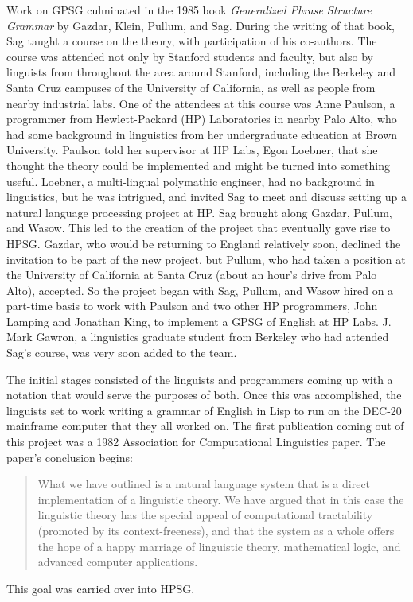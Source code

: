 \documentclass[output=paper]{langsci/langscibook}
\begin{document}
Work on GPSG culminated in the 1985 book \textit{Generalized Phrase Structure Grammar} by Gazdar,  Klein, Pullum, and Sag.  During the writing of that book, Sag taught a course on the theory, with participation of his co-authors.  The course was attended not only by Stanford students and faculty, but also by linguists from throughout the area around Stanford, including the Berkeley and Santa Cruz campuses of the University of California, as well as people from nearby industrial labs.  One of the attendees at this course was Anne Paulson, a programmer from Hewlett-Packard (HP) Laboratories in nearby Palo Alto, who had some background in linguistics from her undergraduate education at Brown University.  Paulson told her supervisor at HP Labs, Egon Loebner, that she thought the theory could be implemented and might be turned into something useful. Loebner, a multi-lingual polymathic engineer, had no background in linguistics, but he was intrigued, and invited Sag to meet and discuss setting up a natural language processing project at HP. Sag brought along Gazdar, Pullum, and Wasow. This led to the creation of the project that eventually gave rise to HPSG.  Gazdar, who would be returning to England relatively soon, declined the invitation to be part of the new project, but Pullum, who had taken a position at the University of California at Santa Cruz (about an hour's drive from Palo Alto), accepted.  So the project began with Sag, Pullum, and Wasow hired on a part-time basis to work with Paulson and two other HP programmers, John Lamping and Jonathan King, to implement a GPSG of English at HP Labs.  J. Mark Gawron, a linguistics graduate student from Berkeley who had attended Sag's course, was very soon added to the team.

The initial stages consisted of the linguists and programmers coming up with a notation that would serve the purposes of both.  Once this was accomplished, the linguists set to work writing a grammar of English in Lisp to run on the DEC-20 mainframe computer that they all worked on.   The first publication coming out of this project was a 1982 Association for Computational Linguistics paper.  The paper's conclusion begins:
\begin{quote}
What we have outlined is a natural language system that is a direct implementation of a linguistic theory.  We have argued that in this case the linguistic theory has the special appeal of computational tractability (promoted by its context-freeness), and that the system as a whole offers the hope of a happy marriage of linguistic theory, mathematical logic, and advanced computer applications. \citep[]{Gaw:Kin:Lam:82}
\end{quote}
This goal was carried over into HPSG.
\end{document}
